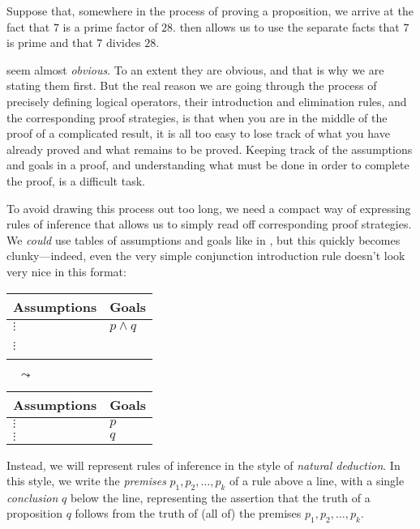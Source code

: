 \begin{example}
\label{exSevenDividesTwentyEightConjunctionAssumption}
Suppose that, somewhere in the process of proving a proposition, we arrive at the fact that $7$ is a prime factor of $28$.  then allows us to use the separate facts that $7$ is prime and that $7$ divides $28$.
\end{example}

 seem almost \textit{obvious}. To an extent they are obvious, and that is why we are stating them first. But the real reason we are going through the process of precisely defining logical operators, their introduction and elimination rules, and the corresponding proof strategies, is that when you are in the middle of the proof of a complicated result, it is all too easy to lose track of what you have already proved and what remains to be proved. Keeping track of the assumptions and goals in a proof, and understanding what must be done in order to complete the proof, is a difficult task.

To avoid drawing this process out too long, we need a compact way of expressing rules of inference that allows us to simply read off corresponding proof strategies. We \textit{could} use tables of assumptions and goals like in , but this quickly becomes clunky---indeed, even the very simple conjunction introduction rule \introrule{\wedge} doesn't look very nice in this format:

\begin{center}
\begin{tabular}{C{60pt}|C{60pt}}
{\small \textbf{Assumptions}} & {\small \textbf{Goals}} \\ \hline
$\vdots$ & $p \wedge q$ \\
$\vdots$ & ~
\end{tabular}
$\quad \leadsto \quad$
\begin{tabular}{C{60pt}|C{60pt}}
{\small \textbf{Assumptions}} & \small{\textbf{Goals}} \\ \hline
$\vdots$ & $p$ \\
$\vdots$ & $q$
\end{tabular}
\end{center}

Instead, we will represent rules of inference in the style of \textit{natural deduction}. In this style, we write the \textit{premises} $p_1,p_2,\dots,p_k$ of a rule above a line, with a single \textit{conclusion} $q$ below the line, representing the assertion that the truth of a proposition $q$ follows from the truth of (all of) the premises $p_1,p_2,\dots,p_k$.

